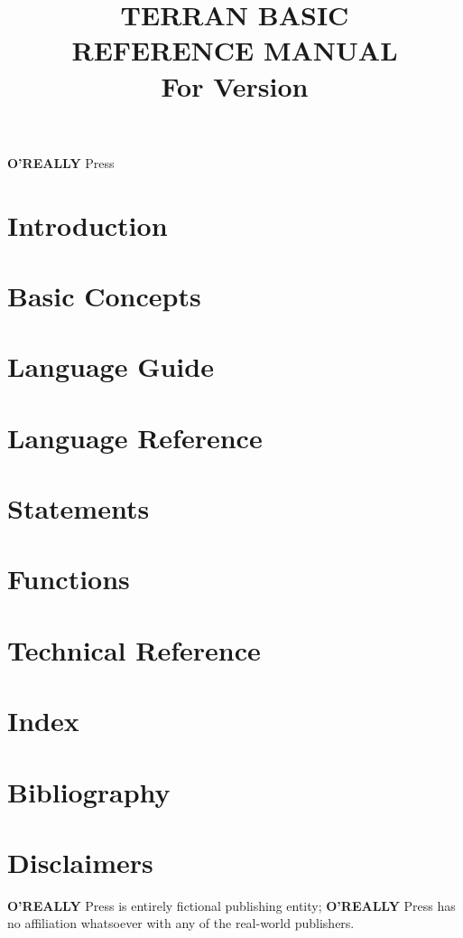 \documentclass[10pt, stock, openany]{memoir}
\title{\HUGE\textbf{TERRAN BASIC \\ REFERENCE MANUAL} \\ \Large \vspace{1em} For Version \tbasver \\ \vspace{7mm} \theedition}
\date{}
\author{}
\newcommand{\oreallypress}{\large\textbf{O'REALLY\raisebox{1ex}{\scriptsize ?}} \normalsize Press}
\begin{document}
\begin{titlingpage}
\maketitle{}
\vfill
\oreallypress
\end{titlingpage}

\setcounter{page}{3}

\tableofcontents*



\openright
\chapter{Introduction}


\openany
\chapter{Basic Concepts}


\chapter{Language Guide}


\chapter{Language Reference}


\chapter{Statements}


\chapter{Functions}


\chapter{Technical Reference}


\chapter{Index}

\chapter{Bibliography}



\chapter*{Disclaimers}

\oreallypress{} is entirely fictional publishing entity; \oreallypress{} has no affiliation whatsoever with any of the real-world publishers.


\afterpage{\pagestyle{empty}\null\newpage}
\end{document}
